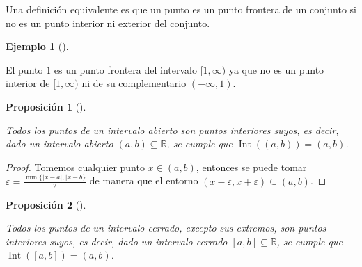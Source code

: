 \documentclass[
  a4paper,
]{scrreport}
\theoremstyle{definition}
\newtheorem{example}{Ejemplo}[chapter]
\theoremstyle{plain}
\theoremstyle{definition}
\theoremstyle{definition}
\theoremstyle{plain}
\theoremstyle{plain}
\newtheorem{proposition}{Proposición}[chapter]
\theoremstyle{remark}
\begin{document}
Una definición equivalente es que un punto es un punto frontera de un
conjunto si no es un punto interior ni exterior del conjunto.

\begin{example}[]\protect\hypertarget{exm-punto-frontera}{}\label{exm-punto-frontera}

El punto \(1\) es un punto frontera del intervalo \([1,\infty)\) ya que
no es un punto interior de \([1,\infty)\) ni de su complementario
\((-\infty,1)\).

\end{example}

\begin{proposition}[]\protect\hypertarget{prp-interior-intervalo-abierto}{}\label{prp-interior-intervalo-abierto}

Todos los puntos de un intervalo abierto son puntos interiores suyos, es
decir, dado un intervalo abierto \((a,b)\subseteq \mathbb{R}\), se
cumple que \(\operatorname{Int}((a,b)) = (a,b)\).

\end{proposition}

\begin{tcolorbox}[enhanced jigsaw, leftrule=.75mm, colbacktitle=quarto-callout-note-color!10!white, toprule=.15mm, opacityback=0, opacitybacktitle=0.6, toptitle=1mm, breakable, bottomtitle=1mm, colframe=quarto-callout-note-color-frame, rightrule=.15mm, titlerule=0mm, title=\textcolor{quarto-callout-note-color}{\faInfo}\hspace{0.5em}{Demostración}, arc=.35mm, left=2mm, bottomrule=.15mm, colback=white, coltitle=black]

\begin{proof}
Tomemos cualquier punto \(x\in (a,b)\), entonces se puede tomar
\(\varepsilon = \frac{\min\{|x-a|,|x-b\}}{2}\) de manera que el entorno
\((x-\varepsilon, x+\varepsilon)\subseteq (a,b)\).
\end{proof}

\end{tcolorbox}

\begin{proposition}[]\protect\hypertarget{prp-interior-intervalo-cerrado}{}\label{prp-interior-intervalo-cerrado}

Todos los puntos de un intervalo cerrado, excepto sus extremos, son
puntos interiores suyos, es decir, dado un intervalo cerrado
\([a,b]\subseteq \mathbb{R}\), se cumple que
\(\operatorname{Int}([a,b]) = (a,b)\).

\end{proposition}
\end{document}
